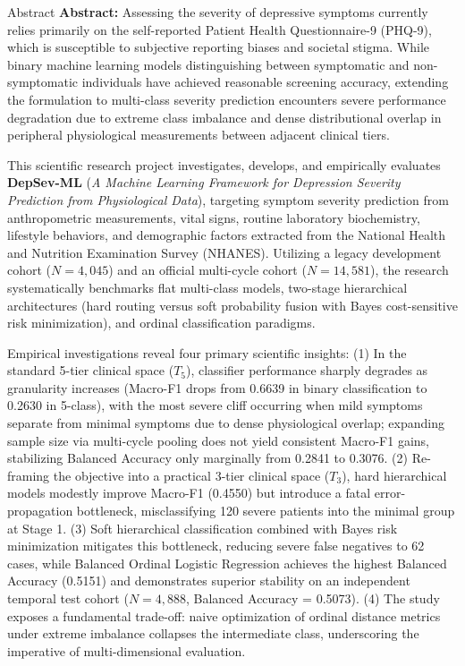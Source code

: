 \documentclass{uetgraduation}
\begin{document}
\begin{preamble}{Abstract}
\textbf{Abstract:} Assessing the severity of depressive symptoms currently relies primarily on the self-reported Patient Health Questionnaire-9 (PHQ-9), which is susceptible to subjective reporting biases and societal stigma. While binary machine learning models distinguishing between symptomatic and non-symptomatic individuals have achieved reasonable screening accuracy, extending the formulation to multi-class severity prediction encounters severe performance degradation due to extreme class imbalance and dense distributional overlap in peripheral physiological measurements between adjacent clinical tiers.

This scientific research project investigates, develops, and empirically evaluates \textbf{DepSev-ML} (\textit{A Machine Learning Framework for Depression Severity Prediction from Physiological Data}), targeting symptom severity prediction from anthropometric measurements, vital signs, routine laboratory biochemistry, lifestyle behaviors, and demographic factors extracted from the National Health and Nutrition Examination Survey (NHANES). Utilizing a legacy development cohort ($N = 4,045$) and an official multi-cycle cohort ($N = 14,581$), the research systematically benchmarks flat multi-class models, two-stage hierarchical architectures (hard routing versus soft probability fusion with Bayes cost-sensitive risk minimization), and ordinal classification paradigms.

Empirical investigations reveal four primary scientific insights: (1) In the standard 5-tier clinical space ($T_5$), classifier performance sharply degrades as granularity increases (Macro-F1 drops from 0.6639 in binary classification to 0.2630 in 5-class), with the most severe cliff occurring when mild symptoms separate from minimal symptoms due to dense physiological overlap; expanding sample size via multi-cycle pooling does not yield consistent Macro-F1 gains, stabilizing Balanced Accuracy only marginally from 0.2841 to 0.3076. (2) Re-framing the objective into a practical 3-tier clinical space ($T_3$), hard hierarchical models modestly improve Macro-F1 (0.4550) but introduce a fatal error-propagation bottleneck, misclassifying 120 severe patients into the minimal group at Stage 1. (3) Soft hierarchical classification combined with Bayes risk minimization mitigates this bottleneck, reducing severe false negatives to 62 cases, while Balanced Ordinal Logistic Regression achieves the highest Balanced Accuracy (0.5151) and demonstrates superior stability on an independent temporal test cohort ($N = 4,888$, Balanced Accuracy = 0.5073). (4) The study exposes a fundamental trade-off: naive optimization of ordinal distance metrics under extreme imbalance collapses the intermediate class, underscoring the imperative of multi-dimensional evaluation.


\end{preamble}
\end{document}
